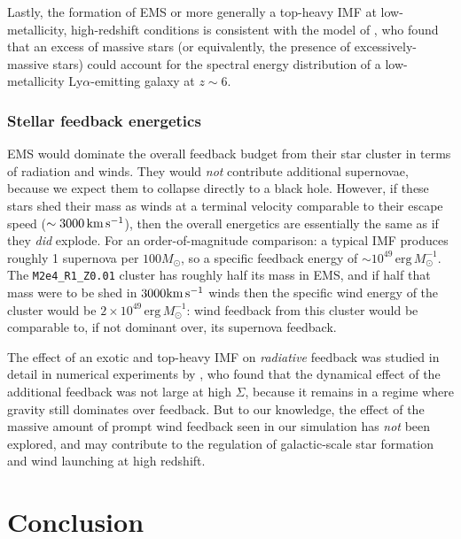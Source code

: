 \documentclass[apjl,twocolumn]{openjournal}
\begin{document}
Lastly, the formation of EMS or more generally a top-heavy IMF at low-metallicity, high-redshift conditions is consistent with the model of \citet{cameron:2023.jwst.topheavy.imf}, who found that an excess of massive stars (or equivalently, the presence of excessively-massive stars) could account for the spectral energy distribution of a low-metallicity Ly$\alpha$-emitting galaxy at $z\sim 6$.


\subsubsection{Stellar feedback energetics}
EMS would dominate the overall feedback budget from their star cluster in terms of radiation and winds. They would {\it not} contribute additional supernovae, because we expect them to collapse directly to a black hole. However, if these stars shed their mass as winds at a terminal velocity comparable to their escape speed ($\sim 3000 \rm \,km\,s^{-1}$), then the overall energetics are essentially the same as if they {\it did} explode. For an order-of-magnitude comparison: a typical IMF produces roughly 1 supernova per $100M_\odot$, so a specific feedback energy of $\sim 10^49\,\mathrm{erg}\,M_\odot^{-1}$. The \texttt{M2e4\_R1\_Z0.01} cluster has roughly half its mass in EMS, and if half that mass were to be shed in $3000\rm km\, s^{-1}$ winds then the specific wind energy of the cluster would be $2\times 10^{49} \,\mathrm{erg}\,M_\odot^{-1}$: wind feedback from this cluster would be comparable to, if not dominant over, its supernova feedback.

The effect of an exotic and top-heavy IMF on {\it radiative} feedback was studied in detail in numerical experiments by \citet{menon:2024.imf.feedback}, who found that the dynamical effect of the additional feedback was not large at high $\Sigma$, because it remains in a regime where gravity still dominates over feedback. But to our knowledge, the effect of the massive amount of prompt wind feedback seen in our simulation has {\it not} been explored, and may contribute to the regulation of galactic-scale star formation and wind launching at high redshift.


\section{Conclusion}
\end{document}
